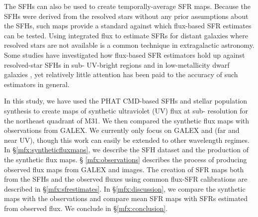 The \citet{Lewis:2014} SFHs can also be used to create temporally-average SFR
maps. Because the SFHs were derived from the resolved stars without any prior
assumptions about the SFHs, such maps provide a standard against which
flux-based SFR estimates \citep[e.g., using any of the calibrations
from][]{Kennicutt:2012} can be tested. Using integrated flux to estimate SFRs
for distant galaxies where resolved stars are not available is a common
technique in extragalactic astronomy. Some studies have investigated how
flux-based SFR estimators hold up against resolved-star SFHs in sub-\kpc{}
UV-bright regions \citep{Simones:2014} and in low-metallicity dwarf galaxies
\citep{McQuinn:2014}, yet relatively little attention has been paid to the
accuracy of such estimators in general.

In this study, we have used the PHAT CMD-based SFHs and stellar population
synthesis to create maps of synthetic ultraviolet (UV) flux at sub-\kpc{}
resolution for the northeast quadrant of M31. We then compared the synthetic
flux maps with observations from GALEX. We currently only focus on GALEX \fuv{}
and \nuv{} (far and near UV), though this work can easily be extended to other
wavelength regimes. In \S \ref{mfx:syntheticfluxmaps}, we describe the SFH
dataset and the production of the synthetic flux maps. \S
\ref{mfx:observations} describes the process of producing observed flux maps
from GALEX \fuv{} and \nuv{} images. The creation of SFR maps both from the
SFHs and the observed fluxes using common flux-SFR calibrations are described
in \S \ref{mfx:sfrestimates}. In \S \ref{mfx:discussion}, we compare the
synthetic maps with the observations and compare mean SFR maps with SFRs
estimated from observed flux. We conclude in \S \ref{mfx:conclusion}.


